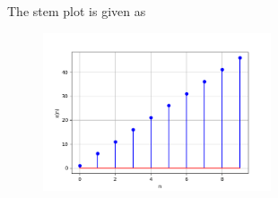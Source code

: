 \documentclass[journal,12pt,twocolumn]{IEEEtran}
\theoremstyle{remark}
\begin{document}
The stem plot is given as
\begin{figure}[h]
  \centering
  \includegraphics[width=0.6\textwidth]{figs/stem.png}
  \label{fig:Stem_Plot}
\end{figure}
\end{document}

